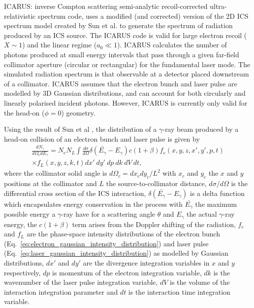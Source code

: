 \documentclass[../main.tex]{subfiles}
\begin{document}
\textsc{ICARUS}: inverse Compton scattering semi-analytic recoil-corrected ultra-relativistic spectrum code, uses a modified (and corrected) version of the 2D ICS spectrum model created by Sun et al. \cite{sun2009characterizations,sun2011theoretical} to generate the spectrum of radiation produced by an ICS source. The \textsc{ICARUS} code is valid for large electron recoil ($X\sim1$) and the linear regime ($a_{0}\ll 1$). \textsc{ICARUS} calculates the number of photons produced at small energy intervals that pass through a given far-field collimator aperture (circular or rectangular) for the fundamental laser mode. The simulated radiation spectrum is that observable at a detector placed downstream of a collimator. \textsc{ICARUS} assumes that the electron bunch and laser pulse are modelled by 3D Gaussian distributions, and can account for both circularly and linearly polarised incident photons. However, \textsc{ICARUS} is currently only valid for the head-on ($\phi = 0$) geometry.

Using the result of Sun et al \cite{sun2009characterizations,sun2011theoretical}, the distribution of a $\gamma$-ray beam produced by a head-on collision of an electron bunch and laser pulse is given by
\begin{multline}
\frac{dN_{\gamma}}{d\Omega_{c} dE_{\gamma}} = N_{e}N_{L}\int \frac{d\sigma}{d\Omega}\delta\left(\bar{E_{\gamma}}-E_{\gamma}\right)c\left(1+\beta\right)f_{e}\left(x,y,z,x',y',p,t\right)\\ \times f_L\left(x,y,z,k,t\right)dx'~dy'~dp~dk~dV~dt,
\label{eq:central_distribution_sun}
\end{multline}
where the collimator solid angle is $d\Omega_{c} = dx_{c}dy_{c}/L^{2}$ with $x_{c}$ and $y_{c}$ the $x$ and $y$ positions at the collimator and $L$ the source-to-collimator distance, $d\sigma/d\Omega$ is the differential cross section of the ICS interaction, $\delta\left(\bar{E_{\gamma}}-E_{\gamma}\right)$ is a delta function which encapsulates energy conservation in the process with $\bar{E_{\gamma}}$ the maximum possible energy a $\gamma$-ray have for a scattering angle $\theta$ and $E_{\gamma}$ the actual $\gamma$-ray energy, the $c\left(1+\beta\right)$ term arises from the Doppler shifting of the radiation, $f_{e}$ and $f_{L}$ are the phase-space intensity distributions of the electron bunch (Eq.~\ref{eq:electron_gaussian_intensity_distribution}) and laser pulse (Eq.~\ref{eq:laser_gaussian_intensity_distribution}) as modelled by Gaussian distributions, $dx'$ and $dy'$ are the divergence integration variables in $x$ and $y$ respectively, $dp$ is momentum of the electron integration variable, $dk$ is the wavenumber of the laser pulse integration variable, $dV$ is the volume of the interaction integration parameter and  $dt$ is the interaction time integration variable. 
\end{document}
